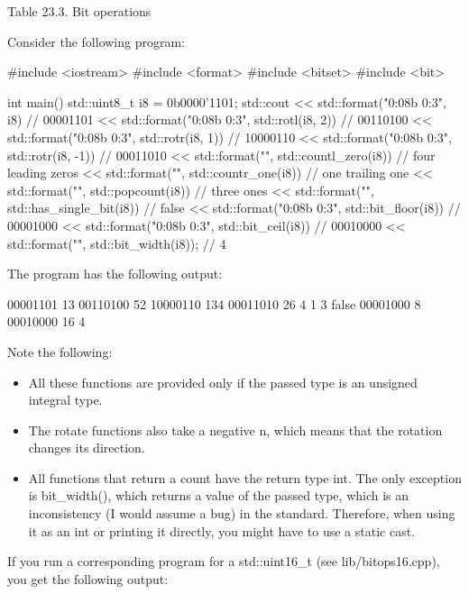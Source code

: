 \begin{center}
Table 23.3. Bit operations
\end{center}

Consider the following program:


\begin{cpp}
#include <iostream>
#include <format>
#include <bitset>
#include <bit>

int main()
{
	std::uint8_t i8 = 0b0000'1101;
	std::cout
		<< std::format("{0:08b} {0:3}\n", i8) // 00001101
		<< std::format("{0:08b} {0:3}\n", std::rotl(i8, 2)) // 00110100
		<< std::format("{0:08b} {0:3}\n", std::rotr(i8, 1)) // 10000110
		<< std::format("{0:08b} {0:3}\n", std::rotr(i8, -1)) // 00011010
		<< std::format("{}\n", std::countl_zero(i8)) // four leading zeros
		<< std::format("{}\n", std::countr_one(i8)) // one trailing one
		<< std::format("{}\n", std::popcount(i8)) // three ones
		<< std::format("{}\n", std::has_single_bit(i8)) // false
		<< std::format("{0:08b} {0:3}\n", std::bit_floor(i8)) // 00001000
		<< std::format("{0:08b} {0:3}\n", std::bit_ceil(i8)) // 00010000
		<< std::format("{}\n", std::bit_width(i8)); // 4
}
\end{cpp}

The program has the following output:

\begin{shell}
00001101  13
00110100  52
10000110 134
00011010  26
4 
1 
3
false
00001000  8
00010000 16
4
\end{shell}

Note the following:

\begin{itemize}
\item 
All these functions are provided only if the passed type is an unsigned integral type.

\item 
The rotate functions also take a negative n, which means that the rotation changes its direction.

\item 
All functions that return a count have the return type int. The only exception is bit\_width(), which returns a value of the passed type, which is an inconsistency (I would assume a bug) in the standard. Therefore, when using it as an int or printing it directly, you might have to use a static cast.
\end{itemize}

If you run a corresponding program for a std::uint16\_t (see lib/bitops16.cpp), you get the following output:

